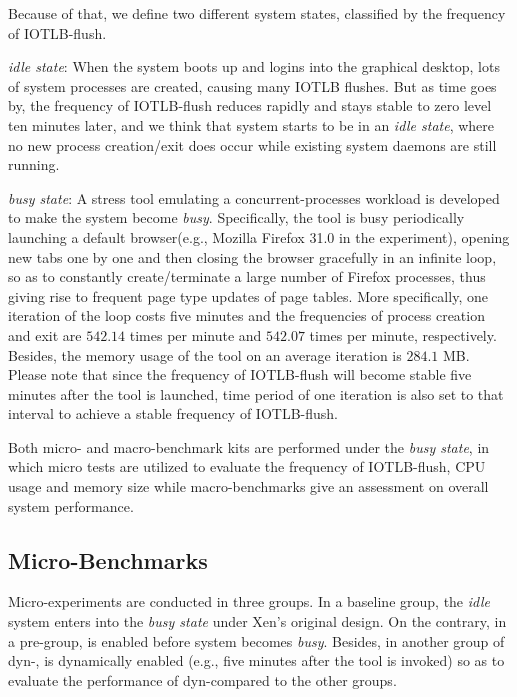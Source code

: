 Because of that, we define two different system states, classified by the frequency of IOTLB-flush.

\emph{idle state}: When the system boots up and logins into the graphical desktop, lots of system processes are created, causing many IOTLB flushes. But as time goes by, the frequency of IOTLB-flush reduces rapidly and stays stable to zero level ten minutes later, and we think that system starts to be in an \emph{idle state}, where no new process creation/exit does occur while existing system daemons are still running.

\emph{busy state}: A stress tool emulating a concurrent-processes workload is developed to make the system become \emph{busy}. Specifically, the tool is busy periodically launching a default browser(e.g., Mozilla Firefox 31.0 in the experiment), opening new tabs one by one and then closing the browser gracefully in an infinite loop, so as to constantly create/terminate a large number of Firefox processes, thus giving rise to frequent page type updates of page tables. More specifically, one iteration of the loop costs five minutes and the frequencies of process creation and exit are $542.14$ times per minute and $542.07$ times per minute, respectively. Besides, the memory usage of the tool on an average iteration is $284.1$ MB. Please note that since the frequency of IOTLB-flush will become stable five minutes after the tool is launched, time period of one iteration is also set to that interval to achieve a stable frequency of IOTLB-flush.

Both micro- and macro-benchmark kits are performed under the \emph{busy state}, in which micro tests are utilized to evaluate the frequency of IOTLB-flush, CPU usage and memory size while macro-benchmarks give an assessment on overall system performance.

\subsection{Micro-Benchmarks}

Micro-experiments are conducted in three groups. In a baseline group, the \emph{idle} system enters into the \emph{busy state} under Xen's original design. On the contrary, in a pre-\name group, \name is enabled before system becomes \emph{busy}. Besides, in another group of dyn-\name, \name is dynamically enabled (e.g., five minutes after the tool is invoked) so as to evaluate the performance of dyn-\name compared to the other groups.

